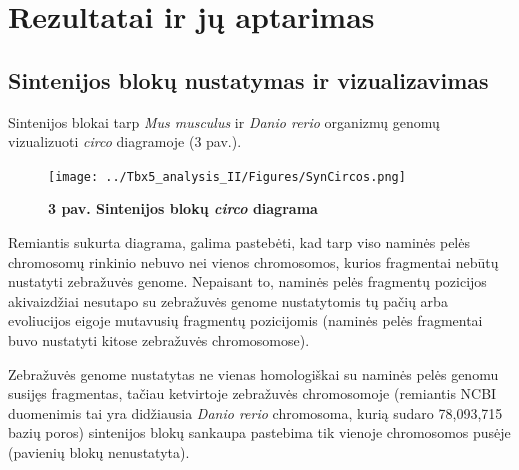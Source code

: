 \documentclass[12pt]{article}
\begin{document}




\newpage


\section{Rezultatai ir jų aptarimas}
\subsection{Sintenijos blokų nustatymas ir vizualizavimas}

Sintenijos blokai tarp \emph{Mus musculus} ir \emph{Danio rerio} organizmų
genomų vizualizuoti \emph{circo} diagramoje (3 pav.).

\begin{figure}[htb]
    \begin{center}
        \texttt{[image: ../Tbx5\_analysis\_II/Figures/SynCircos.png]}
        \vspace{-1\baselineskip}
        \caption*{\small\textbf{3 pav. Sintenijos blokų \emph{circo}
        diagrama}}
        \label{fig:birds}
    \end{center}
\end{figure}

Remiantis sukurta diagrama, galima pastebėti, kad tarp viso naminės pelės
chromosomų rinkinio nebuvo nei vienos chromosomos, kurios fragmentai nebūtų
nustatyti zebražuvės genome. Nepaisant to, naminės pelės fragmentų
pozicijos akivaizdžiai nesutapo su zebražuvės genome nustatytomis tų pačių
arba evoliucijos eigoje mutavusių fragmentų pozicijomis (naminės pelės
fragmentai buvo nustatyti kitose zebražuvės chromosomose).

Zebražuvės genome nustatytas ne vienas homologiškai su naminės pelės genomu
susijęs fragmentas, tačiau ketvirtoje zebražuvės chromosomoje (remiantis
NCBI\cite{NCBI} duomenimis tai yra didžiausia \emph{Danio rerio} chromosoma,
kurią sudaro 78,093,715 bazių poros) sintenijos blokų sankaupa pastebima
tik vienoje chromosomos pusėje (pavienių blokų nenustatyta).
\end{document}
